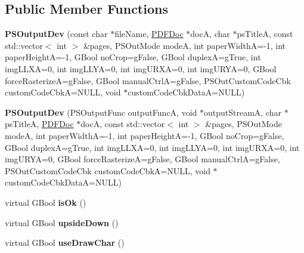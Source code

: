 \subsection*{Public Member Functions}
\begin{DoxyCompactItemize}
\item 
\mbox{\label{class_p_s_output_dev_abb107e186ff72527c7127ea84ce661b9}} 
{\bfseries P\+S\+Output\+Dev} (const char $\ast$file\+Name, \hyperlink{class_p_d_f_doc}{P\+D\+F\+Doc} $\ast$docA, char $\ast$ps\+TitleA, const std\+::vector$<$ int $>$ \&pages, P\+S\+Out\+Mode modeA, int paper\+WidthA=-\/1, int paper\+HeightA=-\/1, G\+Bool no\+Crop=g\+False, G\+Bool duplexA=g\+True, int img\+L\+L\+XA=0, int img\+L\+L\+YA=0, int img\+U\+R\+XA=0, int img\+U\+R\+YA=0, G\+Bool force\+RasterizeA=g\+False, G\+Bool manual\+CtrlA=g\+False, P\+S\+Out\+Custom\+Code\+Cbk custom\+Code\+CbkA=N\+U\+LL, void $\ast$custom\+Code\+Cbk\+DataA=N\+U\+LL)
\item 
\mbox{\label{class_p_s_output_dev_a765f1d1c4fdb7d41f613146d1c667c02}} 
{\bfseries P\+S\+Output\+Dev} (P\+S\+Output\+Func output\+FuncA, void $\ast$output\+StreamA, char $\ast$ps\+TitleA, \hyperlink{class_p_d_f_doc}{P\+D\+F\+Doc} $\ast$docA, const std\+::vector$<$ int $>$ \&pages, P\+S\+Out\+Mode modeA, int paper\+WidthA=-\/1, int paper\+HeightA=-\/1, G\+Bool no\+Crop=g\+False, G\+Bool duplexA=g\+True, int img\+L\+L\+XA=0, int img\+L\+L\+YA=0, int img\+U\+R\+XA=0, int img\+U\+R\+YA=0, G\+Bool force\+RasterizeA=g\+False, G\+Bool manual\+CtrlA=g\+False, P\+S\+Out\+Custom\+Code\+Cbk custom\+Code\+CbkA=N\+U\+LL, void $\ast$custom\+Code\+Cbk\+DataA=N\+U\+LL)
\item 
\mbox{\label{class_p_s_output_dev_a7eff647fac0f5073af18c7d461c6f38c}} 
virtual G\+Bool {\bfseries is\+Ok} ()
\item 
\mbox{\label{class_p_s_output_dev_ae6ca6f3559182ea3a3139b61b55d9da4}} 
virtual G\+Bool {\bfseries upside\+Down} ()
\item 
\mbox{\label{class_p_s_output_dev_ad52c5b0a9eb51179c118b8aeadde498b}} 
virtual G\+Bool {\bfseries use\+Draw\+Char} ()
\item 
\mbox{\label{class_p_s_output_dev_ab5b8c49a28b157ab81881fbd8ddb35c5}} 

\end{DoxyCompactItemize}
